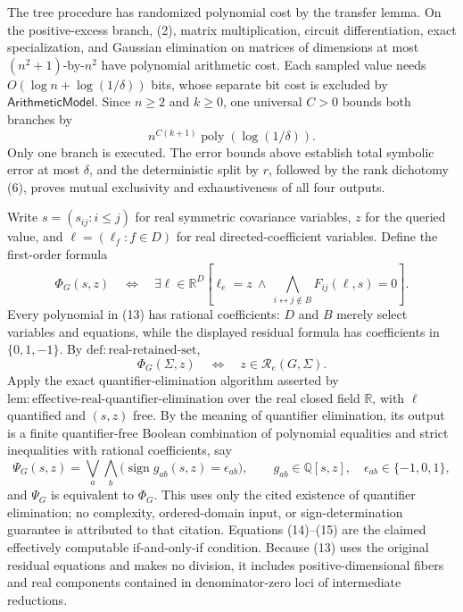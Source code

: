 The tree procedure has randomized polynomial cost by the transfer lemma.  On the positive-excess branch, (2), matrix multiplication, circuit differentiation, exact specialization, and Gaussian elimination on matrices of dimensions at most \((n^2+1)\)-by-\(n^2\) have polynomial arithmetic cost.  Each sampled value needs \(O(\log n+\log(1/\delta))\) bits, whose separate bit cost is excluded by \(\mathsf{ArithmeticModel}\).  Since \(n\geq2\) and \(k\geq0\), one universal \(C>0\) bounds both branches by
\[
 n^{C(k+1)}\operatorname{poly}(\log(1/\delta)).
\tag{12}
\]
Only one branch is executed.  The error bounds above establish total symbolic error at most \(\delta\), and the deterministic split by \(r\), followed by the rank dichotomy (6), proves mutual exclusivity and exhaustiveness of all four outputs.

Write \(s=(s_{ij}:i\leq j)\) for real symmetric covariance variables, \(z\) for the queried value, and \(\ell=(\ell_f:f\in D)\) for real directed-coefficient variables.  Define the first-order formula
\[
 \Phi_G(s,z)\quad\Longleftrightarrow\quad
 \exists\ell\in\mathbb R^D\left[
   \ell_e=z\ \wedge\
   \bigwedge_{i\leftrightarrow j\notin B}F_{ij}(\ell,s)=0
 \right].
\tag{13}
\]
Every polynomial in (13) has rational coefficients: \(D\) and \(B\) merely select variables and equations, while the displayed residual formula has coefficients in \(\{0,1,-1\}\).  By \(\mathrm{def:real\mbox{-}retained\mbox{-}set}\),
\[
 \Phi_G(\Sigma,z)\quad\Longleftrightarrow\quad
 z\in\mathcal R_e(G,\Sigma).
\tag{14}
\]
Apply the exact quantifier-elimination algorithm asserted by \(\mathrm{lem:effective\mbox{-}real\mbox{-}quantifier\mbox{-}elimination}\) over the real closed field \(\mathbb R\), with \(\ell\) quantified and \((s,z)\) free.  By the meaning of quantifier elimination, its output is a finite quantifier-free Boolean combination of polynomial equalities and strict inequalities with rational coefficients, say
\[
 \Psi_G(s,z)=\bigvee_a\bigwedge_b
 \bigl(\operatorname{sign}g_{ab}(s,z)=\epsilon_{ab}\bigr),
 \qquad
 g_{ab}\in\mathbb Q[s,z],\quad
 \epsilon_{ab}\in\{-1,0,1\},
\tag{15}
\]
and \(\Psi_G\) is equivalent to \(\Phi_G\).  This uses only the cited existence of quantifier elimination; no complexity, ordered-domain input, or sign-determination guarantee is attributed to that citation.  Equations (14)--(15) are the claimed effectively computable if-and-only-if condition.  Because (13) uses the original residual equations and makes no division, it includes positive-dimensional fibers and real components contained in denominator-zero loci of intermediate reductions.

